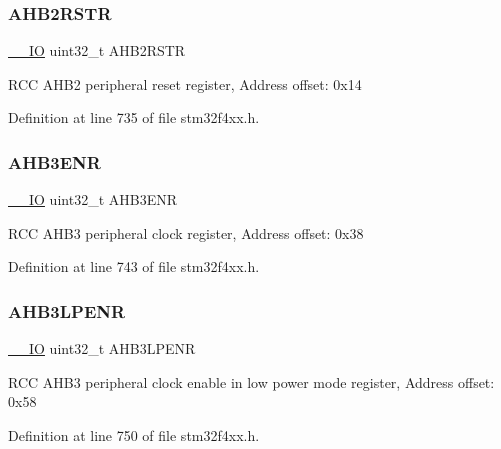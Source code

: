 \subsubsection{\texorpdfstring{A\+H\+B2\+R\+S\+TR}{AHB2RSTR}}
{\footnotesize\ttfamily \hyperlink{group___c_m_s_i_s__core__definitions_gaec43007d9998a0a0e01faede4133d6be}{\+\_\+\+\_\+\+IO} uint32\+\_\+t A\+H\+B2\+R\+S\+TR}

R\+CC A\+H\+B2 peripheral reset register, Address offset\+: 0x14 

Definition at line 735 of file stm32f4xx.\+h.

\mbox{\label{struct_r_c_c___type_def_acdaa650fcd63730825479f6e8f70d4c0}} 
\subsubsection{\texorpdfstring{A\+H\+B3\+E\+NR}{AHB3ENR}}
{\footnotesize\ttfamily \hyperlink{group___c_m_s_i_s__core__definitions_gaec43007d9998a0a0e01faede4133d6be}{\+\_\+\+\_\+\+IO} uint32\+\_\+t A\+H\+B3\+E\+NR}

R\+CC A\+H\+B3 peripheral clock register, Address offset\+: 0x38 

Definition at line 743 of file stm32f4xx.\+h.

\mbox{\label{struct_r_c_c___type_def_a2ff82b9bf0231645108965aa0febd766}} 
\subsubsection{\texorpdfstring{A\+H\+B3\+L\+P\+E\+NR}{AHB3LPENR}}
{\footnotesize\ttfamily \hyperlink{group___c_m_s_i_s__core__definitions_gaec43007d9998a0a0e01faede4133d6be}{\+\_\+\+\_\+\+IO} uint32\+\_\+t A\+H\+B3\+L\+P\+E\+NR}

R\+CC A\+H\+B3 peripheral clock enable in low power mode register, Address offset\+: 0x58 

Definition at line 750 of file stm32f4xx.\+h.

\mbox{\label{struct_r_c_c___type_def_a28560c5bfeb45326ea7f2019dba57bea}} 
